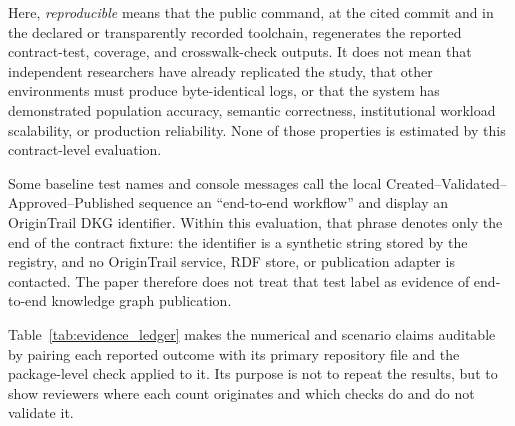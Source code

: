 \documentclass[journal]{IEEEtran}
\begin{document}
Here, \emph{reproducible} means that the public command, at the cited commit
and in the declared or transparently recorded toolchain, regenerates the reported contract-test,
coverage, and crosswalk-check outputs. It does not mean that independent
researchers have already replicated the study, that other environments must
produce byte-identical logs, or that the system has demonstrated population
accuracy, semantic correctness, institutional workload scalability, or
production reliability. None of those properties is estimated by this
contract-level evaluation.

Some baseline test names and console messages call the local Created--Validated--Approved--Published
sequence an ``end-to-end workflow'' and display an OriginTrail DKG identifier.
Within this evaluation, that phrase denotes only the end of the contract
fixture: the identifier is a synthetic string stored by the registry, and no
OriginTrail service, RDF store, or publication adapter is contacted. The paper
therefore does not treat that test label as evidence of end-to-end knowledge
graph publication.

Table~\ref{tab:evidence_ledger} makes the numerical and scenario claims
auditable by pairing each reported outcome with its primary repository file
and the package-level check applied to it. Its purpose is not to repeat the
results, but to show reviewers where each count originates and which checks do
and do not validate it.
\end{document}
